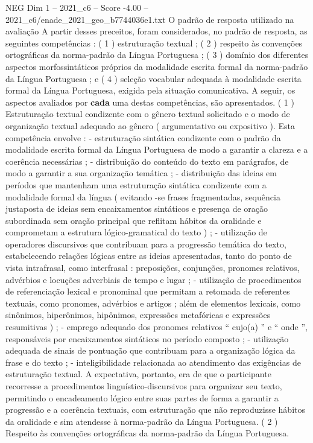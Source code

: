 \begin{textsample}{NEG Dim 1 – 2021\_c6 – Score -4.00 – 2021\_c6/enade\_2021\_geo\_b7744036e1.txt}
O padrão de resposta utilizado na avaliação A partir desses preceitos, foram considerados, no padrão de resposta, as seguintes competências : ( 1 ) estruturação textual ; ( 2 ) respeito às convenções ortográficas da norma-padrão da Língua Portuguesa ; ( 3 ) domínio dos diferentes aspectos morfossintáticos próprios da modalidade escrita formal da norma-padrão da Língua Portuguesa ; e ( 4 ) seleção vocabular adequada à modalidade escrita formal da Língua Portuguesa, exigida pela situação comunicativa.
A seguir, os aspectos avaliados por \textbf{cada} uma destas competências, são apresentados. ( 1 ) Estruturação textual condizente com o gênero textual solicitado e o modo de organização textual adequado ao gênero ( argumentativo ou expositivo ).
Esta competência envolve : - estruturação sintática condizente com o padrão da modalidade escrita formal da Língua Portuguesa de modo a garantir a clareza e a coerência necessárias ; - distribuição do conteúdo do texto em parágrafos, de modo a garantir a sua organização temática ; - distribuição das ideias em períodos que mantenham uma estruturação sintática condizente com a modalidade formal da língua ( evitando -se frases fragmentadas, sequência justaposta de ideias sem encaixamentos sintáticos e presença de oração subordinada sem oração principal que reflitam hábitos da oralidade e comprometam a estrutura lógico-gramatical do texto ) ; - utilização de operadores discursivos que contribuam para a progressão temática do texto, estabelecendo relações lógicas entre as ideias apresentadas, tanto do ponto de vista intrafrasal, como interfrasal : preposições, conjunções, pronomes relativos, advérbios e locuções adverbiais de tempo e lugar ; - utilização de procedimentos de referenciação lexical e pronominal que permitam a retomada de referentes textuais, como pronomes, advérbios e artigos ; além de elementos lexicais, como sinônimos, hiperônimos, hipônimos, expressões metafóricas e expressões resumitivas ) ; - emprego adequado dos pronomes relativos “ cujo(a) ” e “ onde ”, responsáveis por encaixamentos sintáticos no período composto ; - utilização adequada de sinais de pontuação que contribuam para a organização lógica da frase e do texto ; - inteligibilidade relacionada ao atendimento das exigências de estruturação textual.
A expectativa, portanto, era de que o participante recorresse a procedimentos linguístico-discursivos para organizar seu texto, permitindo o encadeamento lógico entre suas partes de forma a garantir a progressão e a coerência textuais, com estruturação que não reproduzisse hábitos da oralidade e sim atendesse à norma-padrão da Língua Portuguesa. ( 2 ) Respeito às convenções ortográficas da norma-padrão da Língua Portuguesa.

\end{textsample}
